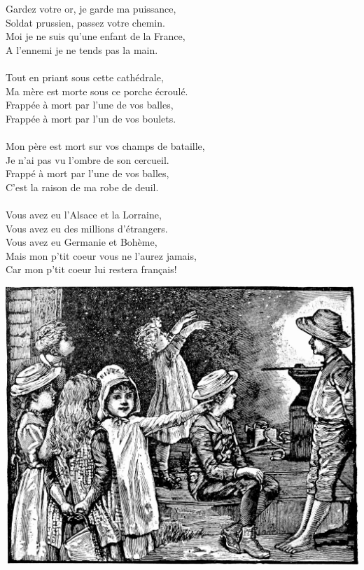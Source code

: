 \breakpage
Gardez votre or, je garde ma puissance,
\\Soldat prussien, passez votre chemin.
\\Moi je ne suis qu'une enfant de la France,
\\A l'ennemi je ne tends pas la main. \bissimple
\\\\Tout en priant sous cette cathédrale,
\\Ma mère est morte sous ce porche écroulé.
\\Frappée à mort par l'une de vos balles,
\\Frappée à mort par l'un de vos boulets. \bissimple
\\\\Mon père est mort sur vos champs de bataille,
\\Je n'ai pas vu l'ombre de son cercueil.
\\Frappé à mort par l'une de vos balles,
\\C'est la raison de ma robe de deuil. \bissimple
\\\\Vous avez eu l'Alsace et la Lorraine,
\\Vous avez eu des millions d'étrangers.
\\Vous avez eu Germanie et Bohème,
\\Mais mon p'tit coeur vous ne l'aurez jamais,
\\Car mon p'tit coeur lui restera français!

\bigskip
\begin{center}
   \includegraphics[width=1\textwidth]{images/brev30.png}
 \end{center}

\breakpage